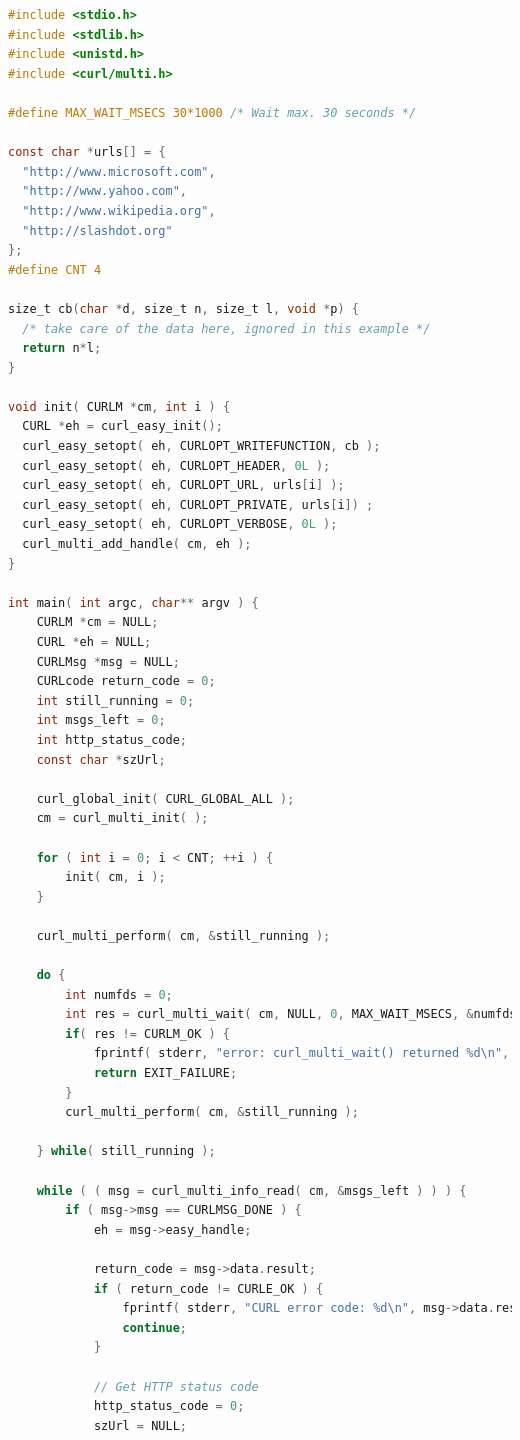 \documentclass[a4paper]{report}
\begin{document}
\begin{lstlisting}[language=C]
#include <stdio.h>
#include <stdlib.h>
#include <unistd.h>
#include <curl/multi.h>

#define MAX_WAIT_MSECS 30*1000 /* Wait max. 30 seconds */

const char *urls[] = {
  "http://www.microsoft.com",
  "http://www.yahoo.com",
  "http://www.wikipedia.org",
  "http://slashdot.org"
};
#define CNT 4

size_t cb(char *d, size_t n, size_t l, void *p) {
  /* take care of the data here, ignored in this example */
  return n*l;
}

void init( CURLM *cm, int i ) {
  CURL *eh = curl_easy_init();
  curl_easy_setopt( eh, CURLOPT_WRITEFUNCTION, cb );
  curl_easy_setopt( eh, CURLOPT_HEADER, 0L );
  curl_easy_setopt( eh, CURLOPT_URL, urls[i] );
  curl_easy_setopt( eh, CURLOPT_PRIVATE, urls[i]) ;
  curl_easy_setopt( eh, CURLOPT_VERBOSE, 0L );
  curl_multi_add_handle( cm, eh );
}

int main( int argc, char** argv ) {
    CURLM *cm = NULL;
    CURL *eh = NULL;
    CURLMsg *msg = NULL;
    CURLcode return_code = 0;
    int still_running = 0; 
    int msgs_left = 0;
    int http_status_code;
    const char *szUrl;

    curl_global_init( CURL_GLOBAL_ALL );
    cm = curl_multi_init( );

    for ( int i = 0; i < CNT; ++i ) {
        init( cm, i );
    }

    curl_multi_perform( cm, &still_running );

    do {
        int numfds = 0;
        int res = curl_multi_wait( cm, NULL, 0, MAX_WAIT_MSECS, &numfds );
        if( res != CURLM_OK ) {
            fprintf( stderr, "error: curl_multi_wait() returned %d\n", res );
            return EXIT_FAILURE;
        }
        curl_multi_perform( cm, &still_running );

    } while( still_running );

    while ( ( msg = curl_multi_info_read( cm, &msgs_left ) ) ) {
        if ( msg->msg == CURLMSG_DONE ) {
            eh = msg->easy_handle;

            return_code = msg->data.result;
            if ( return_code != CURLE_OK ) {
                fprintf( stderr, "CURL error code: %d\n", msg->data.result );
                continue;
            }

            // Get HTTP status code
            http_status_code = 0;
            szUrl = NULL;


\end{lstlisting}
\end{document}
